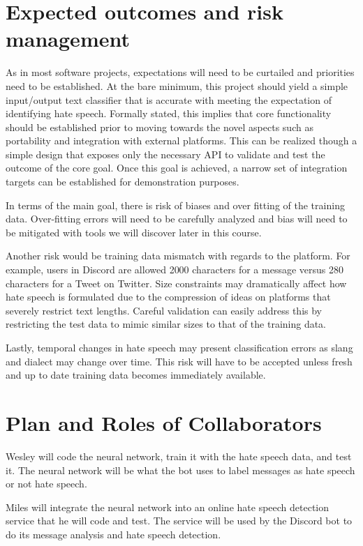 \documentclass[conference]{sig-alternate-05-2015}
\begin{document}
\section{Expected outcomes and risk management}

As in most software projects, expectations will need to be curtailed and priorities need to be established.  At the bare minimum, this project should yield a simple input/output text classifier that is accurate with meeting the expectation of identifying hate speech.  Formally stated, this implies that core functionality should be established prior to moving towards the novel aspects such as portability and integration with external platforms.  This can be realized though a simple design that exposes only the necessary API to validate and test the outcome of the core goal.  Once this goal is achieved, a narrow set of integration targets can be established for demonstration purposes.

In terms of the main goal, there is risk of biases and over fitting of the training data.  Over-fitting errors will need to be carefully analyzed and bias will need to be mitigated with tools we will discover later in this course.

Another risk would be training data mismatch with regards to the platform.  For example, users in Discord are allowed 2000 characters for a message versus 280 characters for a Tweet on Twitter.  Size constraints may dramatically affect how hate speech is formulated due to the compression of ideas on platforms that severely restrict text lengths.  Careful validation can easily address this by restricting the test data to mimic similar sizes to that of the training data.

Lastly, temporal changes in hate speech may present classification errors as slang and dialect may change over time.  This risk will have to be accepted unless fresh and up to date training data becomes immediately available.

\section{Plan and Roles of Collaborators}

Wesley will code the neural network, train it with the hate speech data, and test it. The neural network will be what the bot uses to label messages as hate speech or not hate speech.

Miles will integrate the neural network into an online hate speech detection service that he will code and test. The service will be used by the Discord bot to do its message analysis and hate speech detection. 
\end{document}
